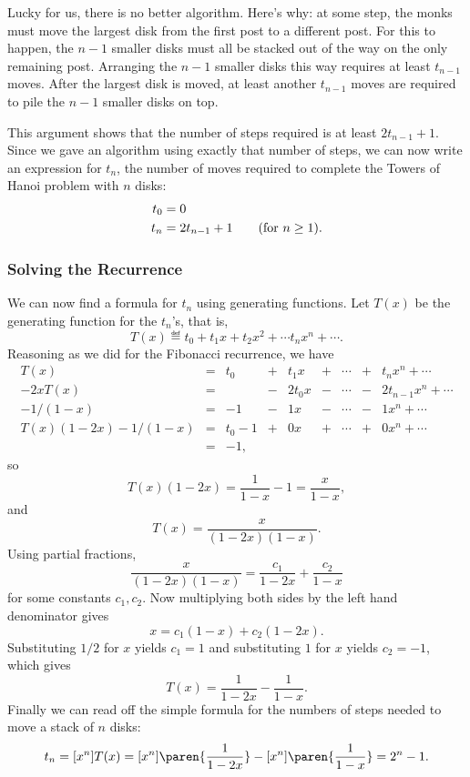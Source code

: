 Lucky for us, there is no better algorithm. Here's why: at some step,
the monks must move the largest disk from the first post to a
different post.  For this to happen, the $n - 1$ smaller disks must all
be stacked out of the way on the only remaining post.  Arranging the $n
- 1$ smaller disks this way requires at least $t_{n-1}$ moves.  After
the largest disk is moved, at least another $t_{n-1}$ moves are
required to pile the $n - 1$ smaller disks on top.

This argument shows that the number of steps required is at least
$2t_{n-1} + 1$.  Since we gave an algorithm using exactly that number
of steps, we can now write an expression for $t_n$, the number of
moves required to complete the Towers of Hanoi problem with $n$ disks:
\begin{align*}
t_0 & = 0 \\
t_n & = 2t_{n-1} + 1 \text{\qquad (for $n \geq 1$)}.
\end{align*}

\subsubsection{Solving the Recurrence}
We can now find a formula for $t_n$ using generating functions.
Let $T(x)$ be the generating function for the $t_n$'s, that
is,
\[
T(x) \eqdef t_0 + t_1 x + t_2 x^2 + \cdots t_n x^n + \cdots.
\]
Reasoning as we did for the Fibonacci recurrence, we have
\[
\begin{array}{rcrcrcrcrcrcrcr}
T(x)     & = & t_0 & + &  t_1 x & + & \cdots & + &     t_n x^n + \cdots\\
-2xT(x)  & = &     & - & 2t_0 x & - & \cdots & - & 2t_{n-1} x^n + \cdots\\
-1/(1-x) & = &  -1 & -  &   1 x & - & \cdots & - &       1 x^n + \cdots\\
\hline
T(x)(1-2x) - 1/(1-x)
         & = & t_0 -1 & + & 0 x & + & \cdots & + &       0 x^n + \cdots\\
         & = & -1,
\end{array}
\]
so
\[
T(x)(1-2x) = \frac{1}{1-x} -1 = \frac{x}{1-x},
\]
and
\[
T(x) = \frac{x}{(1-2x)(1-x)}.
\]
Using partial fractions,
\[
 \frac{x}{(1-2x)(1-x)} = \frac{c_1}{1-2x} +\frac{c_2}{1-x}
\]
for some constants $c_1,c_2$.  Now multiplying both sides by the left
hand denominator gives
\[
 x = c_1(1-x) +c_2(1-2x).
\]
Substituting $1/2$ for $x$ yields $c_1 = 1$ and substituting $1$ for
$x$ yields $c_2 = - 1$, which gives
\[
T(x) = \frac{1}{1-2x} - \frac{1}{1-x}.
\]
Finally we can read off the simple formula for the numbers of steps
needed to move a stack of $n$ disks:
\[
t_n = [x^n]T(x) = [x^n]\paren{\frac{1}{1-2x}} - [x^n]\paren{\frac{1}{1-x}} = 2^n - 1.
\]

